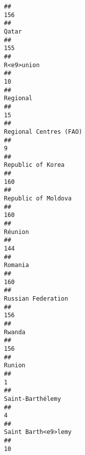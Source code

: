 \documentclass[]{article}
\begin{document}
\begin{verbatim}
##                                                                                          156 
##                                                                                        Qatar 
##                                                                                          155 
##                                                                                   R<e9>union 
##                                                                                           10 
##                                                                                     Regional 
##                                                                                           15 
##                                                                       Regional Centres (FAO) 
##                                                                                            9 
##                                                                            Republic of Korea 
##                                                                                          160 
##                                                                          Republic of Moldova 
##                                                                                          160 
##                                                                                      Réunion 
##                                                                                          144 
##                                                                                      Romania 
##                                                                                          160 
##                                                                           Russian Federation 
##                                                                                          156 
##                                                                                       Rwanda 
##                                                                                          156 
##                                                                                      Runion 
##                                                                                            1 
##                                                                             Saint-Barthélemy 
##                                                                                            4 
##                                                                          Saint Barth<e9>lemy 
##                                                                                           10 

\end{verbatim}
\end{document}
